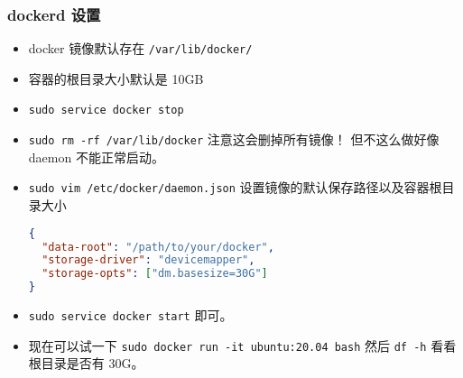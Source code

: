 \subsubsection{dockerd 设置}
\begin{itemize}
\item docker 镜像默认存在 \verb`/var/lib/docker/`
\item 容器的根目录大小默认是 10GB
\item \verb`sudo service docker stop`
\item \verb`sudo rm -rf /var/lib/docker` 注意这会删掉所有镜像！ 但不这么做好像 daemon 不能正常启动。
\item \verb`sudo vim /etc/docker/daemon.json` 设置镜像的默认保存路径以及容器根目录大小
\begin{lstlisting}[language=json]
{
  "data-root": "/path/to/your/docker",
  "storage-driver": "devicemapper",
  "storage-opts": ["dm.basesize=30G"]
}
\end{lstlisting}
\item \verb`sudo service docker start` 即可。
\item 现在可以试一下 \verb`sudo docker run -it ubuntu:20.04 bash` 然后 \verb`df -h` 看看根目录是否有 30G。
\end{itemize}


